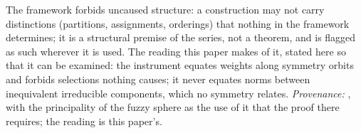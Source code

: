 The framework forbids uncaused structure: a construction may not carry distinctions (partitions, assignments, orderings) that nothing in the framework determines; it is a structural premise of the series, not a theorem, and is flagged as such wherever it is used. The reading this paper makes of it, stated here so that it can be examined: the instrument equates weights along symmetry orbits and forbids selections nothing causes; it never equates norms between inequivalent irreducible components, which no symmetry relates. \emph{Provenance:} \cite[Principle~5.4]{ButlerT8}, with the principality of the fuzzy sphere \cite[Thm.~5.5]{ButlerT8} as the use of it that the proof there requires; the reading is this paper's.
